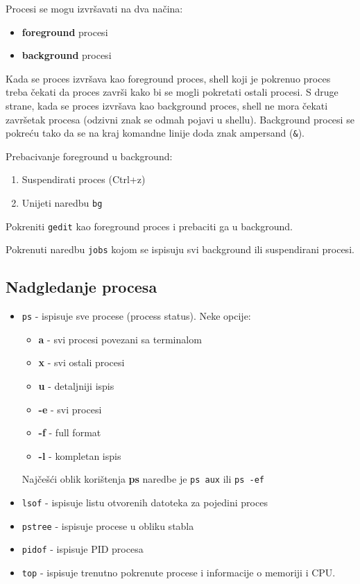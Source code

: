Procesi se mogu izvršavati na dva načina:
\begin{itemize}
 \item \textbf{foreground} procesi 
 \item \textbf{background} procesi
\end{itemize}
Kada se proces izvršava kao foreground proces, shell koji je pokrenuo proces treba čekati da proces završi kako bi se mogli pokretati 
ostali procesi. S druge strane, kada se proces izvršava kao background proces, shell ne mora čekati završetak procesa (odzivni znak se 
odmah pojavi u shellu). Background procesi se pokreću tako da se na kraj komandne linije doda znak ampersand (\texttt{\&}).

Prebacivanje foreground u background:
\begin{enumerate}
 \item Suspendirati proces (Ctrl+z)
 \item Unijeti naredbu \texttt{bg}
\end{enumerate}

\begin{zadatak}
Pokreniti \texttt{gedit} kao foreground proces i prebaciti ga u background.                                                                                             
\end{zadatak}
\begin{zadatak}Pokrenuti naredbu \texttt{jobs} kojom se ispisuju svi background ili suspendirani procesi.
\end{zadatak}


\subsection*{Nadgledanje procesa}
\begin{itemize}
 \item \texttt{ps} - ispisuje sve procese (process status). Neke opcije: 
\begin{itemize}
 \item \textbf{a} - svi procesi povezani sa terminalom
 \item \textbf{x} - svi ostali procesi
 \item \textbf{u} - detaljniji ispis
 \item \textbf{-e} - svi procesi
 \item \textbf{-f} - full format
 \item \textbf{-l} - kompletan ispis
\end{itemize}
Najčešći oblik korištenja \textbf{ps} naredbe je \texttt{ps aux} ili \texttt{ps -ef}

 \item \texttt{lsof} - ispisuje listu otvorenih datoteka za pojedini proces
\item \texttt{pstree} - ispisuje procese u obliku stabla 
\item \texttt{pidof} - ispisuje PID procesa
\item \texttt{top} - ispisuje trenutno pokrenute procese i informacije o memoriji i CPU.
\end{itemize}

